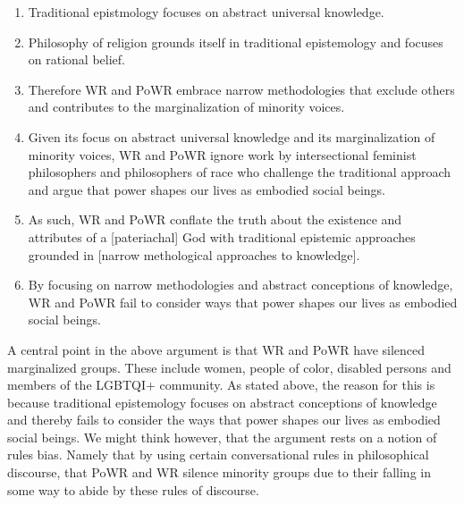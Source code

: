 \documentclass[
  letterpaper,
  DIV=11,
  numbers=noendperiod]{scrreprt}
\providecommand{\tightlist}{%
  \setlength{\itemsep}{0pt}\setlength{\parskip}{0pt}}\usepackage{longtable,booktabs,array}
\begin{document}
\begin{tcolorbox}[enhanced jigsaw, arc=.35mm, breakable, rightrule=.15mm, colback=white, colframe=quarto-callout-important-color-frame, bottomrule=.15mm, leftrule=.75mm, opacityback=0, toprule=.15mm, left=2mm]
\begin{tcolorbox}[enhanced jigsaw, arc=.35mm, breakable, rightrule=.15mm, colback=white, colframe=quarto-callout-tip-color-frame, bottomrule=.15mm, leftrule=.75mm, opacityback=0, toprule=.15mm, left=2mm]
\begin{enumerate}
\def\labelenumi{\arabic{enumi}.}
\tightlist
\item
  Traditional epistmology focuses on abstract universal knowledge.
\item
  Philosophy of religion grounds itself in traditional epistemology and
  focuses on rational belief.
\item
  Therefore WR and PoWR embrace narrow methodologies that exclude others
  and contributes to the marginalization of minority voices.
\item
  Given its focus on abstract universal knowledge and its
  marginalization of minority voices, WR and PoWR ignore work by
  intersectional feminist philosophers and philosophers of race who
  challenge the traditional approach and argue that power shapes our
  lives as embodied social beings.
\item
  As such, WR and PoWR conflate the truth about the existence and
  attributes of a {[}pateriachal{]} God with traditional epistemic
  approaches grounded in {[}narrow methological approaches to
  knowledge{]}.
\item
  By focusing on narrow methodologies and abstract conceptions of
  knowledge, WR and PoWR fail to consider ways that power shapes our
  lives as embodied social beings.
\end{enumerate}

A central point in the above argument is that WR and PoWR have silenced
marginalized groups. These include women, people of color, disabled
persons and members of the LGBTQI+ community. As stated above, the
reason for this is because traditional epistemology focuses on abstract
conceptions of knowledge and thereby fails to consider the ways that
power shapes our lives as embodied social beings. We might think
however, that the argument rests on a notion of rules bias. Namely that
by using certain conversational rules in philosophical discourse, that
PoWR and WR silence minority groups due to their falling in some way to
abide by these rules of discourse.


\end{tcolorbox}
\end{tcolorbox}
\end{document}
